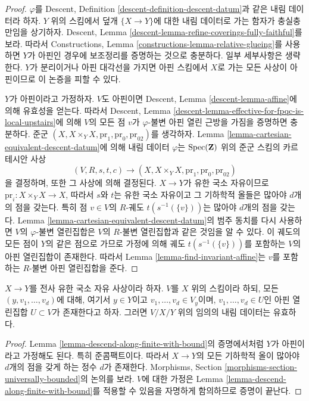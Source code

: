 \begin{proof}
$\varphi$를 Descent, Definition \ref{descent-definition-descent-datum}과 같은 내림 데이터라 하자.
$Y$ 위의 스킴에서 덮개 $\{X \to Y\}$에 대한 내림 데이터로 가는 함자가 충실충만임을 상기하자.
Descent, Lemma \ref{descent-lemma-refine-coverings-fully-faithful}를 보라. 따라서 Constructions,
Lemma \ref{constructions-lemma-relative-glueing}를 사용하면 $Y$가 아핀인 경우에 보조정리를 증명하는 것으로 충분하다.
일부 세부사항은 생략한다. $Y$가 분리이거나 아핀 대각선을 가지면 아핀 스킴에서 $X$로 가는 모든 사상이 아핀이므로
이 논증을 피할 수 있다.

\medskip\noindent
$Y$가 아핀이라고 가정하자. $V$도 아핀이면 Descent, Lemma \ref{descent-lemma-affine}에 의해 유효성을 얻는다.
따라서 Descent, Lemma \ref{descent-lemma-effective-for-fpqc-is-local-upstairs}에 의해 $V$의 모든 점 $v$가
$\varphi$-불변 아핀 열린 근방을 가짐을 증명하면 충분하다. 준군
$(X, X \times_Y X, \text{pr}_1, \text{pr}_0, \text{pr}_{02})$를 생각하자.
Lemma \ref{lemma-cartesian-equivalent-descent-datum}에 의해 내림 데이터 $\varphi$는 $\mathop{\mathrm{Spec}}(\mathbf{Z})$ 위의
준군 스킴의 카르테시안 사상
$$
(V, R, s, t, c)
\longrightarrow
(X, X \times_Y X, \text{pr}_1, \text{pr}_0, \text{pr}_{02})
$$
을 결정하며, 또한 그 사상에 의해 결정된다. $X \to Y$가 유한 국소 자유이므로
$\text{pr}_i : X \times_Y X \to X$, 따라서 $s$와 $t$는 유한 국소 자유이고 그 기하학적 올들은 많아야
$d$개의 점을 갖는다. 특히 점 $v \in V$의 $R$-궤도 $t(s^{-1}(\{v\}))$는 많아야 $d$개의 점을 갖는다.
Lemma \ref{lemma-cartesian-equivalent-descent-datum}의 범주 동치를 다시 사용하면 $V$의 $\varphi$-불변 열린집합은
$V$의 $R$-불변 열린집합과 같은 것임을 알 수 있다. 이 궤도의 모든 점이 $Y$의 같은 점으로 가므로 가정에 의해
궤도 $t(s^{-1}(\{v\}))$를 포함하는 $V$의 아핀 열린집합이 존재한다. 따라서
Lemma \ref{lemma-find-invariant-affine}는 $v$를 포함하는 $R$-불변 아핀 열린집합을 준다.
\end{proof}

\begin{lemma}
\label{lemma-descend-along-finite}
$X \to Y$를 전사 유한 국소 자유 사상이라 하자. $V$를 $X$ 위의 스킴이라 하되, 모든
$(y, v_1, \ldots, v_d)$에 대해, 여기서 $y \in Y$이고 $v_1, \ldots, v_d \in V_y$이며,
$v_1, \ldots, v_d \in U$인 아핀 열린집합 $U \subset V$가 존재한다고 하자.
그러면 $V/X/Y$ 위의 임의의 내림 데이터는 유효하다.
\end{lemma}

\begin{proof}
Lemma \ref{lemma-descend-along-finite-with-bound}의 증명에서처럼 $Y$가 아핀이라고 가정해도 된다.
특히 준콤팩트이다. 따라서 $X \to Y$의 모든 기하학적 올이 많아야 $d$개의 점을 갖게 하는 정수 $d$가 존재한다.
Morphisms, Section \ref{morphisms-section-universally-bounded}의 논의를 보라. $V$에 대한 가정은
Lemma \ref{lemma-descend-along-finite-with-bound}를 적용할 수 있음을 자명하게 함의하므로 증명이 끝난다.
\end{proof}

